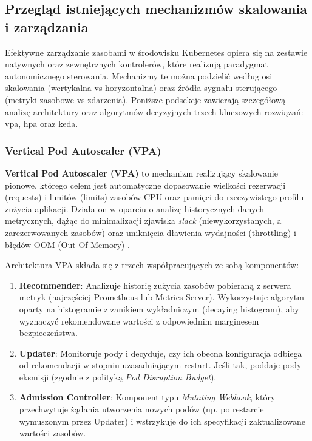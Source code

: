 \subsection{Przegląd istniejących mechanizmów skalowania i zarządzania}

Efektywne zarządzanie zasobami w środowisku Kubernetes opiera się na zestawie natywnych oraz zewnętrznych kontrolerów, które realizują paradygmat autonomicznego sterowania. Mechanizmy te można podzielić według osi skalowania (wertykalna vs horyzontalna) oraz źródła sygnału sterującego (metryki zasobowe vs zdarzenia). Poniższe podsekcje zawierają szczegółową analizę architektury oraz algorytmów decyzyjnych trzech kluczowych rozwiązań: \gls{vpa}, \gls{hpa} oraz \gls{keda}.

\subsubsection{Vertical Pod Autoscaler (VPA)}

\textbf{Vertical Pod Autoscaler (VPA)} to mechanizm realizujący skalowanie pionowe, którego celem jest automatyczne dopasowanie wielkości rezerwacji (requests) i limitów (limits) zasobów CPU oraz pamięci do rzeczywistego profilu zużycia aplikacji. Działa on w oparciu o analizę historycznych danych metrycznych, dążąc do minimalizacji zjawiska \textit{slack} (niewykorzystanych, a zarezerwowanych zasobów) oraz uniknięcia dławienia wydajności (throttling) i błędów OOM (Out Of Memory) \cite{kubernetes_vpa}.

Architektura VPA składa się z trzech współpracujących ze sobą komponentów:
\begin{enumerate}
    \item \textbf{Recommender}: Analizuje historię zużycia zasobów pobieraną z serwera metryk (najczęściej Prometheus lub Metrics Server). Wykorzystuje algorytm oparty na histogramie z zanikiem wykładniczym (decaying histogram), aby wyznaczyć rekomendowane wartości z odpowiednim marginesem bezpieczeństwa.
    \item \textbf{Updater}: Monitoruje pody i decyduje, czy ich obecna konfiguracja odbiega od rekomendacji w stopniu uzasadniającym restart. Jeśli tak, poddaje pody eksmisji (zgodnie z polityką \textit{Pod Disruption Budget}).
    \item \textbf{Admission Controller}: Komponent typu \textit{Mutating Webhook}, który przechwytuje żądania utworzenia nowych podów (np. po restarcie wymuszonym przez Updater) i wstrzykuje do ich specyfikacji zaktualizowane wartości zasobów.
\end{enumerate}

